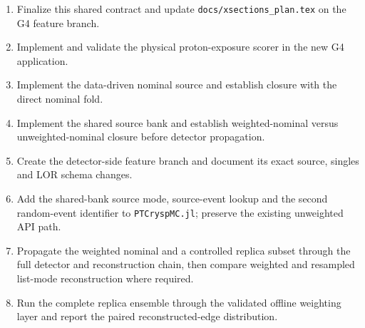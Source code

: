 \documentclass[11pt]{article}
\newcommand{\file}[1]{\texttt{#1}}
\begin{document}
\begin{enumerate}
  \item Finalize this shared contract and update
        \file{docs/xsections\_plan.tex} on the G4 feature branch.

  \item Implement and validate the physical proton-exposure scorer in the new
        G4 application.

  \item Implement the data-driven nominal source and establish closure with
        the direct nominal fold.

  \item Implement the shared source bank and establish weighted-nominal versus
        unweighted-nominal closure before detector propagation.

  \item Create the detector-side feature branch and document its exact source,
        singles and LOR schema changes.

  \item Add the shared-bank source mode, source-event lookup and the second
        random-event identifier to \file{PTCryspMC.jl}; preserve the existing
        unweighted API path.

  \item Propagate the weighted nominal and a controlled replica subset through
        the full detector and reconstruction chain, then compare weighted and
        resampled list-mode reconstruction where required.

  \item Run the complete replica ensemble through the validated offline
        weighting layer and report the paired reconstructed-edge distribution.
\end{enumerate}
\end{document}
